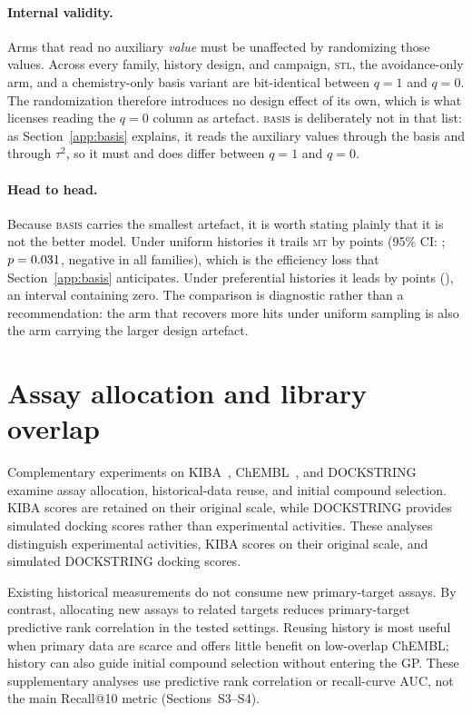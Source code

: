 \documentclass[10pt]{article}
\newcommand{\stl}{\textsc{stl}}
\newcommand{\mt}{\textsc{mt}}
\newcommand{\basis}{\textsc{basis}}
\begin{document}
\paragraph{Internal validity.}
Arms that read no auxiliary \emph{value} must be unaffected by randomizing
those values. Across every family, history design, and campaign, \stl{}, the
avoidance-only arm, and a chemistry-only basis variant are bit-identical
between $q=1$ and $q=0$. The randomization therefore introduces no design
effect of its own, which is what licenses reading the $q=0$ column as
artefact. \basis{} is deliberately not in that list: as
Section~\ref{app:basis} explains, it reads the auxiliary values through the
basis and through $\tau^2$, so it must and does differ between $q=1$ and
$q=0$.

\paragraph{Head to head.}
Because \basis{} carries the smallest artefact, it is worth stating plainly
that it is not the better model. Under uniform histories it trails \mt{} by
\decompBasisMinusMtUniform{} points
(95\% CI: \decompBasisMinusMtUniformCi{};
$p=0.031{}$, negative in all
\decompFamilies{} families), which is the efficiency loss that
Section~\ref{app:basis} anticipates. Under preferential histories it leads by
\decompBasisMinusMtPreferential{} points
(\decompBasisMinusMtPreferentialCi{}), an interval containing zero. The
comparison is diagnostic rather than a recommendation: the arm that recovers
more hits under uniform sampling is also the arm carrying the larger
design artefact.

\section{Assay allocation and library overlap}
\label{app:sharing}

Complementary experiments on KIBA~\cite{tang2014kiba},
ChEMBL~\cite{chembl2019}, and DOCKSTRING~\cite{dockstring2022}
examine assay allocation, historical-data reuse,
and initial compound selection. KIBA scores
are retained on their original scale, while
DOCKSTRING provides simulated docking scores
rather than experimental activities.
These analyses distinguish experimental activities, KIBA scores on their
original scale, and simulated DOCKSTRING docking scores.

Existing historical measurements do not consume new
primary-target assays. By contrast, allocating new assays
to related targets reduces primary-target predictive rank
correlation in the tested settings. Reusing history is most
useful when primary data are scarce and offers little benefit
on low-overlap ChEMBL; history can also guide initial
compound selection without entering the GP. These supplementary
analyses use predictive rank correlation or recall-curve AUC,
not the main Recall@10 metric (Sections~S3--S4).
\end{document}

